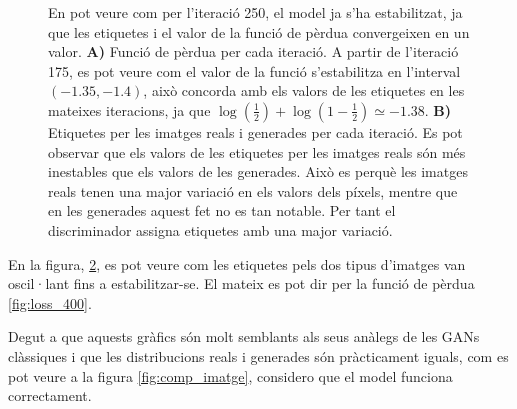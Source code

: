 \begin{figure}[H]
\begin{subfigure}{0.45\textwidth}
		\caption{} \label{fig:labels_400}
	\end{subfigure}
	\caption{En pot veure com per l'iteració 250, el model ja s'ha estabilitzat, ja que les etiquetes i el valor de la funció de pèrdua convergeixen en un valor. \textbf{A)} Funció de pèrdua per cada iteració. A partir de l'iteració 175, es pot veure com el valor de la funció s'estabilitza en l'interval $(-1.35, -1.4)$, això concorda amb els valors de les etiquetes en les mateixes iteracions, ja que $\log(\frac{1}{2}) + \log(1-\frac{1}{2}) \simeq -1.38$. \textbf{B)} Etiquetes per les imatges reals i generades per cada iteració. Es pot observar que els valors de les etiquetes per les imatges reals són més inestables que els valors de les generades. Això es perquè les imatges reals tenen una major variació en els valors dels píxels, mentre que en les generades aquest fet no es tan notable. Per tant el discriminador assigna etiquetes amb una major variació.}
\end{figure}

En la figura, \ref{fig:labels_400}, es pot veure com les etiquetes pels dos tipus d'imatges van oscil·lant fins a estabilitzar-se. El mateix es pot dir per la funció de pèrdua \ref{fig:loss_400}.  

Degut a que aquests gràfics són molt semblants als seus anàlegs de les GANs clàssiques i que les distribucions reals i generades són pràcticament iguals, com es pot veure a la figura \ref{fig:comp_imatge}, considero que el model funciona correctament. 


